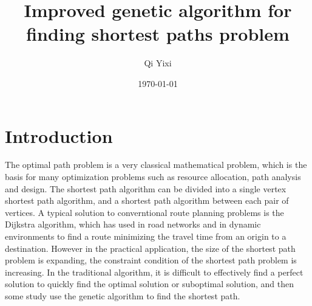 \documentclass[12pt]{article}
\title{Improved genetic algorithm for finding shortest paths problem}
\author{Qi Yixi}
\date{\today}
\begin{document}
\maketitle{}
\section{Introduction}
	The optimal path problem is a very classical mathematical problem, which is the basis for many optimization problems such as resource allocation, path analysis and design. The shortest path algorithm can be divided into a single vertex shortest path algorithm, and a shortest path algorithm between each pair of vertices. A typical solution to converntional route planning problems is the Dijkstra algorithm, which has used in road networks and in dynamic environments to find a route minimizing the travel time from an origin to a destination. However in the practical application, the size of the shortest path problem is expanding, the constraint condition of the shortest path problem is increasing. In the traditional algorithm, it is difficult to effectively find a perfect solution to quickly find the optimal solution or suboptimal solution, and then some study use the genetic algorithm to find the shortest path.
\end{document}
